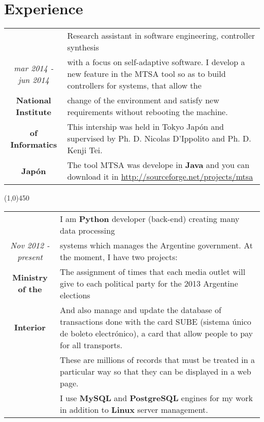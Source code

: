 \section{Experience}

\begin{tabular}{c|p{12.5cm}}
& \large Research assistant in software engineering, controller synthesis \\
\large\textit{mar 2014 - jun 2014} &  \large with a focus on self-adaptive software. I develop a new feature
in the MTSA tool so as to build controllers for systems, that allow the \\
\large\textbf{National Institute} & \large change of the environment and satisfy new requirements
without rebooting the machine. \\
\large\textbf{of Informatics} & \large  This intership was held in Tokyo Japón and supervised by  
Ph. D. Nicolas D'Ippolito and Ph. D. Kenji Tei.\\
\large\textbf{Japón}  & \large The tool MTSA was develope in \textbf{Java} and you can 
download it in \url{http://sourceforge.net/projects/mtsa}\\
\end{tabular}


\begin{center}
\line(1,0){450}
\end{center}

\begin{tabular}{c|p{12.5cm}}
& \large I am \textbf{Python} developer (back-end) creating many data processing\\
\large\textit{Nov 2012 - present} &  \large systems which manages the Argentine government. At the moment, I have two projects:\\
\large\textbf{Ministry of the} & \large The assignment of times that each media outlet will give to each political party for the 2013 Argentine elections\\
\large\textbf{Interior}& \large And also manage and update the database of transactions done with
the card SUBE (sistema único de boleto electrónico), a card that allow people to pay for all
transports. \\
& \large These are millions of records that must be treated in a particular way so that they can
be displayed in a web page.\\
& \large I use \textbf{MySQL} and \textbf{PostgreSQL} engines for my work in addition to \textbf{Linux} server management.\\
\end{tabular}

